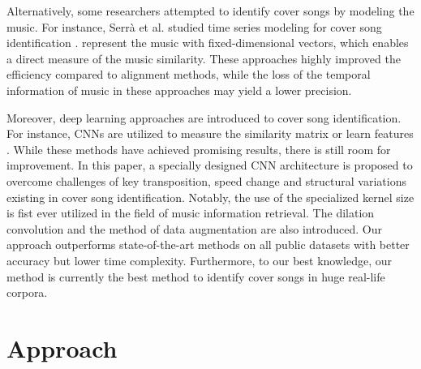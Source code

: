 \documentclass{article}
\begin{document}
Alternatively, some researchers attempted to identify cover songs by modeling the music. For instance, Serrà et al. studied time series modeling for cover song identification \cite{serra2009cross}. 
\cite{bertin2012large,osmalsky2016enhancing} represent the music with fixed-dimensional vectors, which enables a direct measure of the music similarity. These approaches highly improved the efficiency compared to alignment methods, while the loss of the temporal information of music in these approaches may yield a lower precision.

Moreover, deep learning approaches are introduced to cover song identification. For instance, CNNs are utilized to measure the similarity matrix \cite{chang_audio_2017} or learn features \cite{qi2017audio,xu2018key,yu2019temporal,DBLP:journals/corr/abs-1907-01824}. While these methods have achieved promising results, there is still room for improvement.
In this paper, a specially designed CNN architecture is proposed to overcome challenges of key transposition, speed change and structural variations existing in cover song identification. Notably, the use of the specialized kernel size is fist ever utilized in the field of music information retrieval. The dilation convolution and the method of data augmentation are also introduced. Our approach outperforms state-of-the-art methods on all public datasets with better accuracy but lower time complexity. Furthermore, to our best knowledge, our method is currently the best method to identify cover songs in huge real-life corpora. 









\section{Approach}
\end{document}
